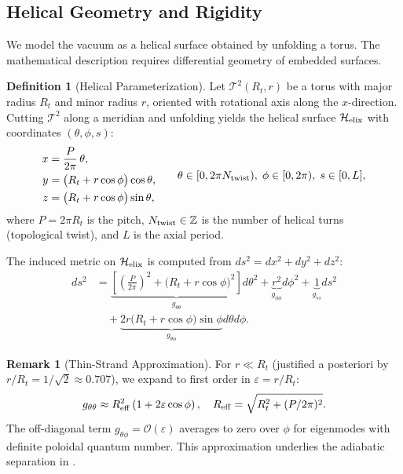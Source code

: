 \documentclass[12pt, a4paper]{article}
\theoremstyle{definition}
\newtheorem{definition}[theorem]{Definition}
\newtheorem{remark}[theorem]{Remark}
\newcommand{\cT}{\mathcal{T}}
\newcommand{\cO}{\mathcal{O}}
\newcommand{\bbZ}{\mathbb{Z}}
\newcommand{\eps}{\varepsilon}
\newcommand{\Hel}{\mathcal{H}_{\rm elix}}
\newcommand{\Tw}{N_{\rm twist}}
\begin{document}
\subsection{Helical Geometry and Rigidity}
We model the vacuum as a helical surface obtained by unfolding a torus. The mathematical description requires differential geometry of embedded surfaces.

\begin{definition}[Helical Parameterization]
Let $\cT^2(R_t, r)$ be a torus with major radius $R_t$ and minor radius $r$, oriented with rotational axis along the $x$-direction. Cutting $\cT^2$ along a meridian and unfolding yields the helical surface $\Hel$ with coordinates $(\theta, \phi, s)$:
\begin{equation}
\begin{aligned}
x &= \frac{P}{2\pi}\,\theta, \\
y &= \bigl(R_t + r\cos\phi\bigr)\cos\theta, \\
z &= \bigl(R_t + r\cos\phi\bigr)\sin\theta,
\end{aligned}
\qquad 
\theta\in[0,2\pi \Tw),\;\phi\in[0,2\pi),\;s\in[0,L],
\label{eq:helix-param}
\end{equation}
where $P = 2\pi R_t$ is the pitch, $\Tw \in \bbZ$ is the number of helical turns (topological twist), and $L$ is the axial period.
\end{definition}

The induced metric on $\Hel$ is computed from $ds^2 = dx^2 + dy^2 + dz^2$:
\begin{equation}
\begin{aligned}
ds^2 &= \underbrace{\left[\left(\frac{P}{2\pi}\right)^2 + \bigl(R_t + r\cos\phi\bigr)^2\right]}_{g_{\theta\theta}} d\theta^2 
+ \underbrace{r^2}_{g_{\phi\phi}} d\phi^2 
+ \underbrace{1}_{g_{ss}} ds^2 \\
&\quad + \underbrace{2r\bigl(R_t + r\cos\phi\bigr)\sin\phi}_{g_{\theta\phi}} d\theta d\phi.
\end{aligned}
\label{eq:helical-metric}
\end{equation}

\begin{remark}[Thin-Strand Approximation]
For $r \ll R_t$ (justified a posteriori by $r/R_t = 1/\sqrt{2} \approx 0.707$), we expand to first order in $\eps = r/R_t$:
\begin{equation}
g_{\theta\theta} \approx R_{\rm eff}^2 \left(1 + 2\eps\cos\phi\right), \quad R_{\rm eff} = \sqrt{R_t^2 + (P/2\pi)^2}.
\end{equation}
The off-diagonal term $g_{\theta\phi} = \cO(\eps)$ averages to zero over $\phi$ for eigenmodes with definite poloidal quantum number. This approximation underlies the adiabatic separation in .
\end{remark}
\end{document}
